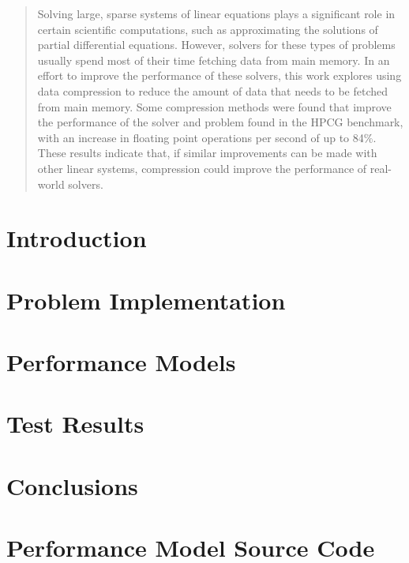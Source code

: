 \documentclass[]{csbsjuthesis}
\title{}
\author{Neil Lindquist}
\date{April 2019}
\begin{document}
\theoremstyle{definition}
\newtheorem{example}{Example}

\begin{abstract}
	Solving large, sparse systems of linear equations plays a significant role in certain scientific computations, such as approximating the solutions of partial differential equations.
	However, solvers for these types of problems usually spend most of their time fetching data from main memory.
	In an effort to improve the performance of these solvers, this work explores using data compression to reduce the amount of data that needs to be fetched from main memory.
	Some compression methods were found that improve the performance of the solver and problem found in the HPCG benchmark, with an increase in floating point operations per second of up to 84\%.
	These results indicate that, if similar improvements can be made with other linear systems, compression could improve the performance of real-world solvers.
\end{abstract}

\maketitle

\section{Introduction}


\section{Problem Implementation}
\label{sec:bg}


\section{Performance Models}


\section{Test Results}
\label{sec:results}


\section{Conclusions}




\appendix

\section{Performance Model Source Code}
\label{app:decode-model-source}

 
\end{document}
